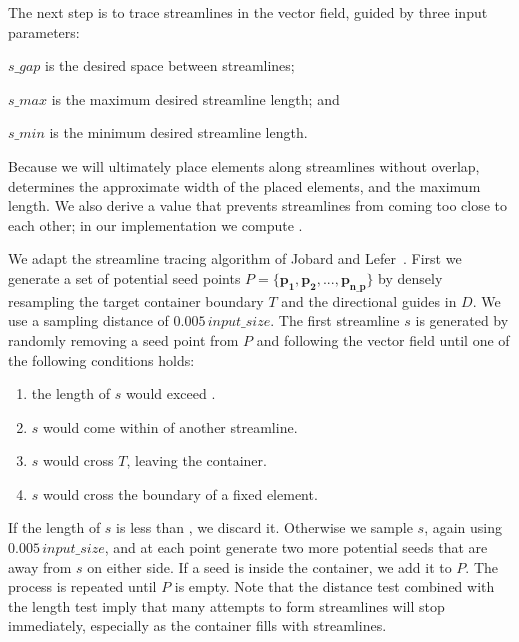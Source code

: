 \newtext
{
The next step is to trace streamlines in the vector field, guided by three input parameters:
\begin{packeddescriptions}
\item[$s\_gap$] is the desired space between streamlines;
\item[$s\_max$] is the maximum desired streamline length; and
\item[$s\_min$] is the minimum desired streamline length.   
\end{packeddescriptions}
Because we will ultimately place elements along streamlines without overlap,  determines
the approximate width of the placed elements, and  the maximum length.  We also derive
a value  that prevents streamlines from coming too close to each other; in our implementation we
compute .
}

We adapt the streamline tracing algorithm of Jobard and Lefer~\cite{Jobard1997}.
First we generate a set of potential seed points $P = \{ \bm{p_{1}}, \bm{p_{2}}, ... , \bm{p_{n\text{\_}p}}\}$  by
densely resampling the target container boundary $T$ and the directional guides in $D$.
We use a sampling distance of $0.005\,input\_size$.
The first streamline $s$ is generated by randomly removing a seed point from $P$ and following
the vector field until one of the following conditions holds:

\begin{enumerate}
\item the length of $s$ would exceed .
\item $s$ would come within  of another streamline.
\item $s$ would cross $T$, leaving the container.
\item $s$ would cross the boundary of a fixed element.
\end{enumerate}


If the length of $s$ is less than , we discard it. Otherwise we sample 
$s$, again using $0.005\,input\_size$, and at each point generate two more
potential seeds that are  away from $s$ on either side. If a seed is
inside the container, we add it to $P$.  The process is repeated until $P$ is empty.
Note that the  distance test combined with the  length
test imply that many attempts to form streamlines will stop immediately,
especially as the container fills with streamlines.

